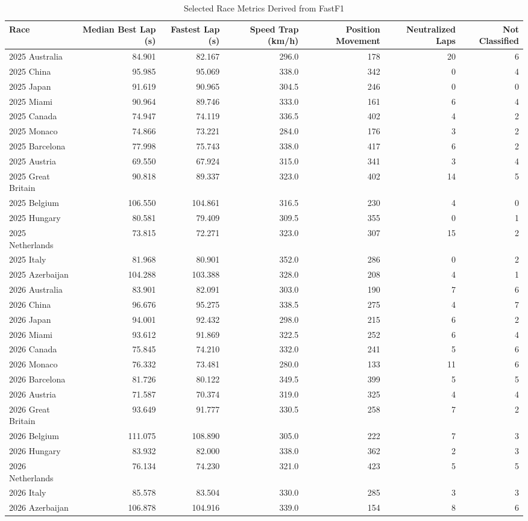 \documentclass[conference]{IEEEtran}
\begin{document}
\begin{table}[t]
\caption{Selected Race Metrics Derived from FastF1}
\label{tab:metrics}
\centering
\begin{tabular}{lrrrrrr}
\hline
Race & Median Best Lap (s) & Fastest Lap (s) & Speed Trap (km/h) & Position Movement & Neutralized Laps & Not Classified \\
\hline
2025 Australia & 84.901 & 82.167 & 296.0 & 178 & 20 & 6 \\
2025 China & 95.985 & 95.069 & 338.0 & 342 & 0 & 4 \\
2025 Japan & 91.619 & 90.965 & 304.5 & 246 & 0 & 0 \\
2025 Miami & 90.964 & 89.746 & 333.0 & 161 & 6 & 4 \\
2025 Canada & 74.947 & 74.119 & 336.5 & 402 & 4 & 2 \\
2025 Monaco & 74.866 & 73.221 & 284.0 & 176 & 3 & 2 \\
2025 Barcelona & 77.998 & 75.743 & 338.0 & 417 & 6 & 2 \\
2025 Austria & 69.550 & 67.924 & 315.0 & 341 & 3 & 4 \\
2025 Great Britain & 90.818 & 89.337 & 323.0 & 402 & 14 & 5 \\
2025 Belgium & 106.550 & 104.861 & 316.5 & 230 & 4 & 0 \\
2025 Hungary & 80.581 & 79.409 & 309.5 & 355 & 0 & 1 \\
2025 Netherlands & 73.815 & 72.271 & 323.0 & 307 & 15 & 2 \\
2025 Italy & 81.968 & 80.901 & 352.0 & 286 & 0 & 2 \\
2025 Azerbaijan & 104.288 & 103.388 & 328.0 & 208 & 4 & 1 \\
2026 Australia & 83.901 & 82.091 & 303.0 & 190 & 7 & 6 \\
2026 China & 96.676 & 95.275 & 338.5 & 275 & 4 & 7 \\
2026 Japan & 94.001 & 92.432 & 298.0 & 215 & 6 & 2 \\
2026 Miami & 93.612 & 91.869 & 322.5 & 252 & 6 & 4 \\
2026 Canada & 75.845 & 74.210 & 332.0 & 241 & 5 & 6 \\
2026 Monaco & 76.332 & 73.481 & 280.0 & 133 & 11 & 6 \\
2026 Barcelona & 81.726 & 80.122 & 349.5 & 399 & 5 & 5 \\
2026 Austria & 71.587 & 70.374 & 319.0 & 325 & 4 & 4 \\
2026 Great Britain & 93.649 & 91.777 & 330.5 & 258 & 7 & 2 \\
2026 Belgium & 111.075 & 108.890 & 305.0 & 222 & 7 & 3 \\
2026 Hungary & 83.932 & 82.000 & 338.0 & 362 & 2 & 3 \\
2026 Netherlands & 76.134 & 74.230 & 321.0 & 423 & 5 & 5 \\
2026 Italy & 85.578 & 83.504 & 330.0 & 285 & 3 & 3 \\
2026 Azerbaijan & 106.878 & 104.916 & 339.0 & 154 & 8 & 6 \\
\hline
\end{tabular}
\end{table}
\end{document}
